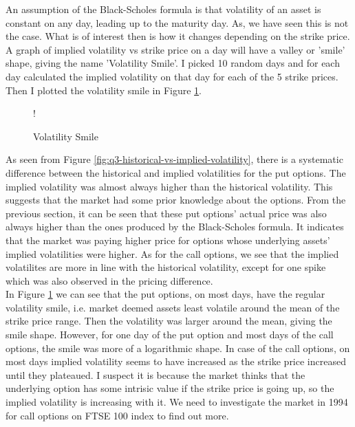 \documentclass[11pt, fleqn]{article}
\begin{document}
An assumption of the Black-Scholes formula is that volatility of an asset is constant on any day, leading up to the maturity day. As, we have seen this is not the case. What is of interest then is how it changes depending on the strike price. A graph of implied volatility vs strike price on a day will have a valley or 'smile' shape, giving the name 'Volatility Smile'. I picked 10 random days and for each day calculated the implied volatility on that day for each of the 5 strike prices. Then I plotted the volatility smile in Figure \ref{fig:q3-volatility-smile}.

\begin{figure}[!h]
   \centering 
   	\resizebox {0.6\textwidth} {!} { }
    \caption{Volatility Smile}
	\label{fig:q3-volatility-smile}
\end{figure}

As seen from Figure \ref{fig:q3-historical-vs-implied-volatility}, there is a systematic difference between the historical and implied volatilities for the put options. The implied volatility was almost always higher than the historical volatility. This suggests that the market had some prior knowledge about the options. From the previous section, it can be seen that these put options' actual price was also always higher than the ones produced by the Black-Scholes formula. It indicates that the market was paying higher price for options whose underlying assets' implied volatilities were higher. As for the call options, we see that the implied volatilites are more in line with the historical volatility, except for one spike which was also observed in the pricing difference.\\

In Figure \ref{fig:q3-volatility-smile} we can see that the put options, on most days, have the regular volatility smile, i.e. market deemed assets least volatile around the mean of the strike price range. Then the volatility was larger around the mean, giving the smile shape. However, for one day of the put option and most days of the call options, the smile was more of a logarithmic shape. In case of the call options, on most days implied volatility seems to have increased as the strike price increased until they plateaued. I suspect it is because the market thinks that the underlying option has some intrisic value if the strike price is going up, so the implied volatility is increasing with it. We need to investigate the market in 1994 for call options on FTSE 100 index to find out more.
\end{document}
